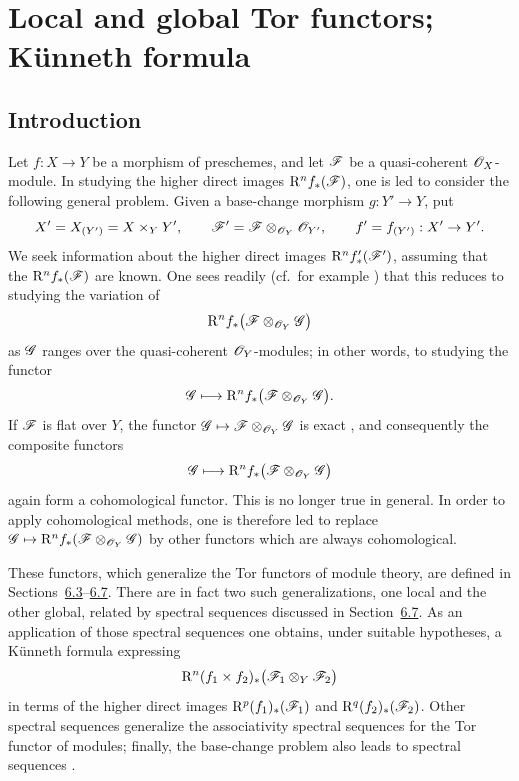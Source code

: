\section{Local and global Tor functors; K\"unneth formula}
\label{section:III.6}


\subsection{Introduction}
\label{subsection:III.6.1}


\begin{env}[6.1.1]
\label{III.6.1.1}
Let $f:X\to Y$ be a morphism of preschemes, and let $\mathscr{F}$ be
a quasi-coherent $\mathscr{O}_X$-module.  In studying the higher direct
images $\mathrm R^n f_*(\mathscr{F})$, one is led to consider the following
general problem.  Given a base-change morphism $g:Y'\to Y$, put
\[
  X'=X_{(Y')}=X\times_Y Y',\qquad
  \mathscr{F}'=\mathscr{F}\otimes_{\mathscr{O}_Y}\mathscr{O}_{Y'},\qquad
  f'=f_{(Y')}:X'\to Y'.
\]
We seek information about the higher direct images
$\mathrm R^n f'_*(\mathscr{F}')$, assuming that the
$\mathrm R^n f_*(\mathscr{F})$ are known.  One sees readily
(cf.\ for example ) that this reduces to studying
the variation of
\[
  \mathrm R^n f_*\bigl(\mathscr{F}\otimes_{\mathscr{O}_Y}\mathscr{G}\bigr)
\]
as $\mathscr{G}$ ranges over the quasi-coherent $\mathscr{O}_Y$-modules;
in other words, to studying the functor
\[
  \mathscr{G}\longmapsto
  \mathrm R^n f_*\bigl(\mathscr{F}\otimes_{\mathscr{O}_Y}\mathscr{G}\bigr).
\]
If $\mathscr{F}$ is flat over $Y$, the functor
$\mathscr{G}\mapsto\mathscr{F}\otimes_{\mathscr{O}_Y}\mathscr{G}$ is exact
, and consequently the composite functors
\[
  \mathscr{G}\longmapsto
  \mathrm R^n f_*\bigl(\mathscr{F}\otimes_{\mathscr{O}_Y}\mathscr{G}\bigr)
\]
again form a cohomological functor.  This is no longer true in
general.  In order to apply cohomological methods, one is therefore
led to replace
$\mathscr{G}\mapsto
\mathrm R^n f_*(\mathscr{F}\otimes_{\mathscr{O}_Y}\mathscr{G})$
by other functors which are always cohomological.

These functors, which generalize the Tor functors of module theory,
are defined in Sections~\hyperref[subsection:III.6.3]{6.3}--\hyperref[subsection:III.6.7]{6.7}.  There are in fact two such
generalizations, one local and the other global, related by spectral
sequences discussed in Section~\hyperref[subsection:III.6.7]{6.7}.  As an application of those
spectral sequences one obtains, under suitable hypotheses, a
K\"unneth formula expressing
\[
  \mathrm R^n(f_1\times f_2)_*
  \bigl(\mathscr{F}_1\otimes_Y\mathscr{F}_2\bigr)
\]
in terms of the higher direct images
$\mathrm R^p(f_1)_*(\mathscr{F}_1)$ and
$\mathrm R^q(f_2)_*(\mathscr{F}_2)$.  Other spectral sequences
 generalize the associativity spectral sequences for
the Tor functor of modules; finally, the base-change problem also
leads to spectral sequences .
\end{env}

